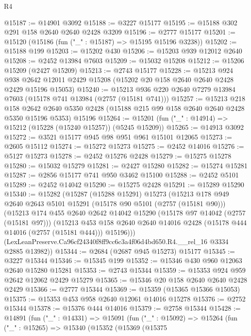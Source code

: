 \begin{lexlean}{R4}
\begin{coremodule}
@15187 := @14901 @3092
@15188 := @3227 @15177
@15195 := @15188 @302 @291 @158 @2640 @2640 @2428 @3209
@15196 := @2777 @15177
@15201 := @15120 (@15186 (fun ("_" : @15187) => @15195 @15196 @3238))
@15202 := @15188 @199
@15203 := @15202 @430
@15206 := @15203 @939 @12012 @2640
@15208 := @2452 @13984 @7603
@15209 := @15032 @15208
@15212 := @15206 @15209 (@2427 @15209)
@15213 := @2743 @15177
@15228 := @15213
    @924
    @938
    @2642
    @12011
    @2429
    @15208
    (@15202 @20 @158 @2640 @2640 @2428 @2429 @15196 @15053)
@15240 := @15213 @936 @220 @2640 @7279 @13984 @7603 (@15178 @741 @13984 (@2757 (@15181 @741)))
@15257 := @15213
    @218
    @158
    @2642
    @2640
    @5350
    @2428
    (@15188 @215 @99 @158 @2640 @2640 @2428 @5350 @15196 @5353)
    @15196
@15264 := @15201 (fun ("_" : @14914) => @15212 (@15228 (@15240 @15257)) (@5245 @15209))
@15265 := @14913 @3092
@15272 := @3521 @15177 @945 @98 @951 @961 @15101 @12065
@15273 := @2605 @15112
@15274 := @15272 @15273
@15275 := @2452 @14016
@15276 := @5127 @15273
@15278 := @2452 @15276 @2428
@15279 := @15275 @15278
@15280 := @15032 @15279
@15281 := @2427 @15280
@15282 := @15274 @15281
@15287 := @2856 @15177 @741 @950 @3462 @15100
@15288 := @2452 @5101
@15289 := @2452 @14042
@15290 := @15275 @2428
@15291 := @15289 @15290
@15340 := @15282
    (@15287
      (@15288 @15291)
      @15273
      (@15213
        @178
        @949
        @2640
        @2643
        @5101
        @15291
        (@15178 @90 @5101 (@2757 (@15181 @90)))
        (@15213
          @174
          @455
          @2640
          @2642
          @14042
          @15290
          (@15178 @97 @14042 (@2757 (@15181 @97)))
          (@15213
            @453
            @158
            @2640
            @2640
            @14016
            @2428
            (@15178 @444 @14016 (@2757 (@15181 @444)))
            @15196)))
      (LexLeanPreserve.Ca96cf24340f8ff9cc6c3a4f06d4bd650.R4.__rel_16 @3334 @2885 @13982))
@15344 := @2684 (@2687 @945 @15273) @15177
@15345 := @3227 @15344
@15346 := @15345 @199
@15352 := @15346 @430 @960 @12063 @2640 @15280 @15281
@15353 := @2743 @15344
@15359 := @15353 @924 @959 @2642 @12062 @2429 @15279
@15365 := @15346 @20 @158 @2640 @2640 @2428 @2429
@15366 := @2777 @15344
@15369 := @15359 (@15365 @15366 @15053)
@15375 := @15353 @453 @958 @2640 @12061 @14016 @15278
@15376 := @2752 @15344
@15378 := @15376 @444 @14016
@15379 := @2758 @15344
@15428 := @14891
    (fun ("_" : @14331) =>
    @15091
      (fun ("_" : @15092) =>
      @15264
        (fun ("_" : @15265) =>
        @15340
          (@15352
            (@15369
              (@15375

\end{coremodule}
\end{lexlean}
